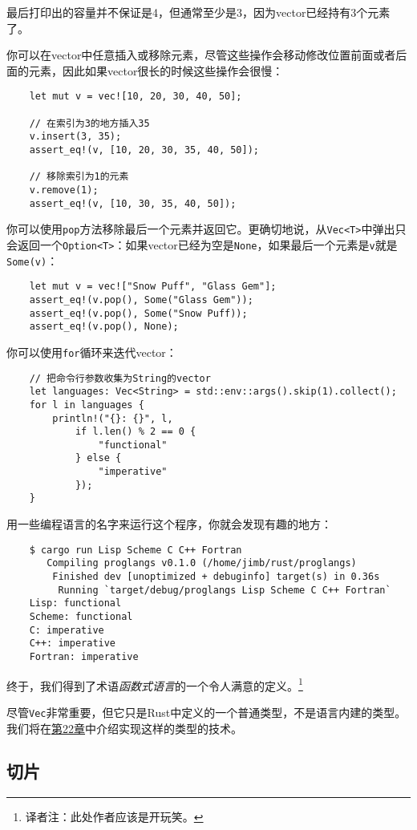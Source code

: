 最后打印出的容量并不保证是4，但通常至少是3，因为vector已经持有3个元素了。

你可以在vector中任意插入或移除元素，尽管这些操作会移动修改位置前面或者后面的元素，因此如果vector很长的时候这些操作会很慢：
\begin{verbatim}
    let mut v = vec![10, 20, 30, 40, 50];

    // 在索引为3的地方插入35
    v.insert(3, 35);
    assert_eq!(v, [10, 20, 30, 35, 40, 50]);

    // 移除索引为1的元素
    v.remove(1);
    assert_eq!(v, [10, 30, 35, 40, 50]);
\end{verbatim}

你可以使用\texttt{pop}方法移除最后一个元素并返回它。更确切地说，从\texttt{Vec<T>}中弹出只会返回一个\texttt{Option<T>}：如果vector已经为空是\texttt{None}，如果最后一个元素是\texttt{v}就是\texttt{Some(v)}：
\begin{verbatim}
    let mut v = vec!["Snow Puff", "Glass Gem"];
    assert_eq!(v.pop(), Some("Glass Gem"));
    assert_eq!(v.pop(), Some("Snow Puff));
    assert_eq!(v.pop(), None);
\end{verbatim}

你可以使用\texttt{for}循环来迭代vector：
\begin{verbatim}
    // 把命令行参数收集为String的vector
    let languages: Vec<String> = std::env::args().skip(1).collect();
    for l in languages {
        println!("{}: {}", l,
            if l.len() % 2 == 0 {
                "functional"
            } else {
                "imperative"
            });
    }
\end{verbatim}

用一些编程语言的名字来运行这个程序，你就会发现有趣的地方：
\begin{verbatim}
    $ cargo run Lisp Scheme C C++ Fortran
       Compiling proglangs v0.1.0 (/home/jimb/rust/proglangs)
        Finished dev [unoptimized + debuginfo] target(s) in 0.36s
         Running `target/debug/proglangs Lisp Scheme C C++ Fortran`
    Lisp: functional
    Scheme: functional
    C: imperative
    C++: imperative
    Fortran: imperative
\end{verbatim}

终于，我们得到了术语\emph{函数式语言}的一个令人满意的定义。\footnote{译者注：此处作者应该是开玩笑。}

尽管\texttt{Vec}非常重要，但它只是Rust中定义的一个普通类型，不是语言内建的类型。我们将在\hyperref[ch22]{第22章}中介绍实现这样的类型的技术。

\subsection{切片}\label{slice}

